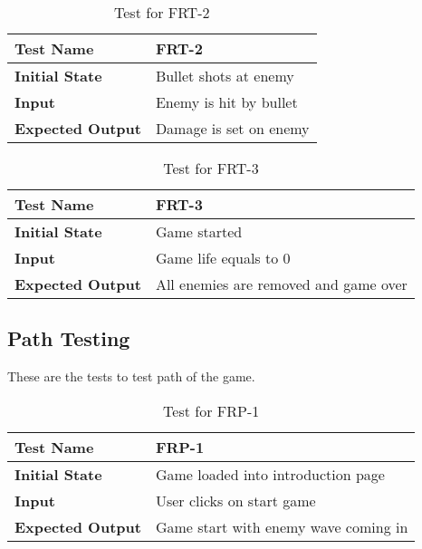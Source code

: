 \documentclass[12,english]{article}
\begin{document}
        \begin{table}[h!]
        	\begin{tabular}[r]{|l|l|}
        	    \hline
        		\textbf{Test Name} & FRT-2 \\ 
        		\hline
        		\textbf{Initial State} & Bullet shots at enemy\\ 
        		\hline
        		\textbf{Input} & Enemy is hit by bullet\\ 
        		\hline 
        		\textbf{Expected Output} & Damage is set on enemy\\ 
        		\hline
        	\end{tabular}
        	\caption{Test for FRT-2}
        	\label{Table}
        \end{table}
        
        \begin{table}[h!]
        	\begin{tabular}[r]{|l|l|}
        	    \hline
        		\textbf{Test Name} & FRT-3 \\ 
        		\hline
        		\textbf{Initial State} & Game started\\ 
        		\hline
        		\textbf{Input} & Game life equals to 0\\ 
        		\hline 
        		\textbf{Expected Output} & All enemies are removed and game over\\ 
        		\hline
        	\end{tabular}
        	\caption{Test for FRT-3}
        	\label{Table}
        \end{table}

    \subsection{Path Testing}
    These are the tests to test path of the game.
        \begin{table}[h!]
        	\begin{tabular}[r]{|l|l|}
        	    \hline
        		\textbf{Test Name} & FRP-1 \\ 
        		\hline
        		\textbf{Initial State} & Game loaded into introduction page\\ 
        		\hline
        		\textbf{Input} & User clicks on start game\\ 
        		\hline 
        		\textbf{Expected Output} & Game start with enemy wave coming in\\ 
        		\hline
        	\end{tabular}
        	\caption{Test for FRP-1}
        	\label{Table}
        \end{table}
        
\end{document}
